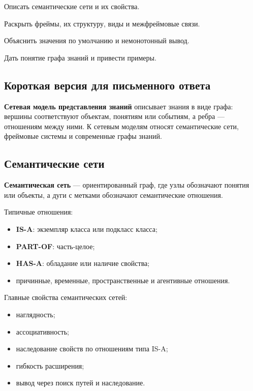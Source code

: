 
\begin{examplan}
    \item Описать семантические сети и их свойства.
    \item Раскрыть фреймы, их структуру, виды и межфреймовые связи.
    \item Объяснить значения по умолчанию и немонотонный вывод.
    \item Дать понятие графа знаний и привести примеры.
\end{examplan}

\subsection*{Короткая версия для письменного ответа}

\textbf{Сетевая модель представления знаний} описывает знания в виде графа: вершины соответствуют объектам, понятиям или событиям, а ребра --- отношениям между ними. К сетевым моделям относят семантические сети, фреймовые системы и современные графы знаний.

\subsection*{Семантические сети}

\textbf{Семантическая сеть} --- ориентированный граф, где узлы обозначают понятия или объекты, а дуги с метками обозначают семантические отношения.

Типичные отношения:
\begin{itemize}
    \item \textbf{IS-A}: экземпляр класса или подкласс класса;
    \item \textbf{PART-OF}: часть-целое;
    \item \textbf{HAS-A}: обладание или наличие свойства;
    \item причинные, временные, пространственные и агентивные отношения.
\end{itemize}

Главные свойства семантических сетей:
\begin{itemize}
    \item наглядность;
    \item ассоциативность;
    \item наследование свойств по отношениям типа IS-A;
    \item гибкость расширения;
    \item вывод через поиск путей и наследование.
\end{itemize}

